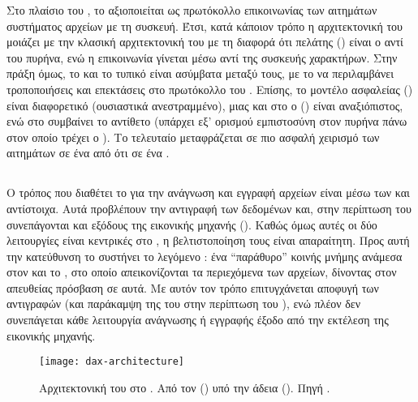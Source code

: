 Στο πλαίσιο του \viofs{}, το  αξιοποιείται ως πρωτόκολλο επικοινωνίας
των αιτημάτων συστήματος αρχείων με τη συσκευή. Έτσι, κατά κάποιον τρόπο η
αρχιτεκτονική του μοιάζει με την κλασική αρχιτεκτονική του  με τη
διαφορά ότι πελάτης () είναι ο  αντί του πυρήνα, ενώ η
επικοινωνία γίνεται μέσω  αντί της  συσκευής χαρακτήρων.
Στην πράξη όμως, το \viofs{} και το τυπικό  είναι ασύμβατα μεταξύ τους,
με το \viofs{} να περιλαμβάνει τροποποιήσεις και επεκτάσεις στο πρωτόκολλο του
. Επίσης, το μοντέλο ασφαλείας () είναι διαφορετικό
(ουσιαστικά ανεστραμμένο), μιας και στο \viofs{} ο  (\guest{}) είναι
αναξιόπιστος, ενώ στο  συμβαίνει το αντίθετο (υπάρχει εξ' ορισμού
εμπιστοσύνη στον πυρήνα πάνω στον οποίο τρέχει ο ). Το τελευταίο
μεταφράζεται σε πιο ασφαλή χειρισμό των αιτημάτων σε ένα \viofs{}  από ότι σε ένα .


\subsection{}
Ο τρόπος που διαθέτει το  για την ανάγνωση και εγγραφή αρχείων είναι
μέσω των  και  αντίστοιχα. Αυτά
προβλέπουν την αντιγραφή των δεδομένων και, στην περίπτωση του \viofs{}
συνεπάγονται και εξόδους της εικονικής μηχανής (). Καθώς όμως αυτές
οι δύο λειτουργίες είναι κεντρικές στο , η βελτιστοποίηση τους
είναι απαραίτητη. Προς αυτή την κατεύθυνση το \viofs{} συστήνει το λεγόμενο
: ένα ``παράθυρο'' κοινής μνήμης ανάμεσα στον \host{} και το
\guest{}, στο οποίο απεικονίζονται τα περιεχόμενα των αρχείων, δίνοντας στον
\guest{} απευθείας πρόσβαση σε αυτά. Με αυτόν τον τρόπο επιτυγχάνεται αποφυγή
των αντιγραφών (και παράκαμψη της  του  στην περίπτωση
του \linux{}), ενώ πλέον δεν συνεπάγεται κάθε λειτουργία ανάγνωσης ή εγγραφής
έξοδο από την εκτέλεση της εικονικής μηχανής.

\begin{figure}
    \centering
    \texttt{[image: dax-architecture]}
    \caption[Αρχιτεκτονική του  στο \viofs{}]{Αρχιτεκτονική του
         στο \viofs{}. Από τον 
        () υπό την άδεια 
        ().
        Πηγή
        .}
    \label{fig:dax-architecture}
\end{figure}

